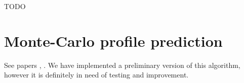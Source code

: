 \documentclass{report}
\begin{document}
TODO

\section{Monte-Carlo profile prediction}

See papers \cite{eval-14}, \cite{eval-15}. We have implemented a preliminary version of this algorithm,
however it is definitely in need of testing and improvement.

\nocite{*}


 

\end{document}

